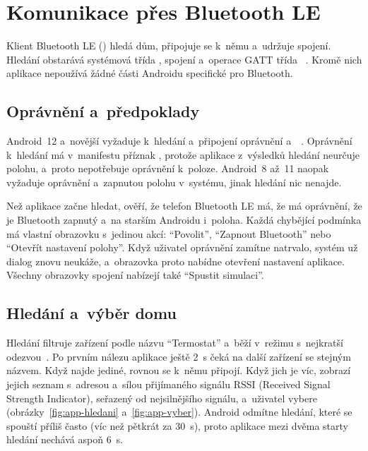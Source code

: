 \section{Komunikace přes Bluetooth LE}
\label{sec:app-ble}

Klient Bluetooth LE () hledá dům, připojuje se k~němu a~udržuje
spojení. Hledání obstarává systémová třída , spojení a~operace GATT
třída ~\cite{app-android-gatt}. Kromě nich aplikace nepoužívá žádné části
Androidu specifické pro Bluetooth.

\subsection{Oprávnění a~předpoklady}

Android~12 a~novější vyžaduje k~hledání a~připojení oprávnění 
a~~\cite{app-android-ble-opravneni}. Oprávnění k~hledání má v~manifestu
příznak , protože aplikace z~výsledků hledání neurčuje polohu, a~proto
nepotřebuje oprávnění k~poloze. Android~8 až~11 naopak vyžaduje oprávnění
 a~zapnutou polohu v~systému, jinak hledání nic nenajde.

Než aplikace začne hledat, ověří, že telefon Bluetooth LE má, že má oprávnění, že je Bluetooth
zapnutý a~na starším Androidu i~poloha. Každá chybějící podmínka má vlastní obrazovku s~jedinou
akcí: \enquote{Povolit}, \enquote{Zapnout Bluetooth} nebo \enquote{Otevřít nastavení polohy}.
Když uživatel oprávnění zamítne natrvalo, systém už dialog znovu neukáže, a~obrazovka proto
nabídne otevření nastavení aplikace. Všechny obrazovky spojení nabízejí také
\enquote{Spustit simulaci}.

\subsection{Hledání a~výběr domu}

Hledání filtruje zařízení podle názvu \enquote{Termostat} a~běží v~režimu s~nejkratší
odezvou~\cite{app-android-ble-hledani}. Po prvním nálezu aplikace ještě 2~s čeká na další
zařízení se stejným názvem. Když najde jediné, rovnou se k~němu připojí. Když jich je víc,
zobrazí jejich seznam s~adresou a~sílou přijímaného signálu RSSI (Received Signal Strength
Indicator), seřazený od nejsilnějšího signálu, a~uživatel vybere (obrázky~\ref{fig:app-hledani}
a~\ref{fig:app-vyber}). Android odmítne hledání, které se spouští příliš často (víc než pětkrát
za 30~s), proto aplikace mezi dvěma starty hledání nechává aspoň 6~s.


